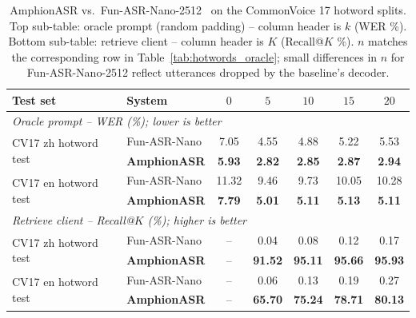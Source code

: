 \begin{table}[t]
  \caption{AmphionASR vs.\ Fun-ASR-Nano-2512~\cite{funasrnano} on
    the CommonVoice 17 hotword splits. Top sub-table: oracle prompt
    (random padding) -- column header is $k$ (WER \%). Bottom
    sub-table: retrieve client -- column header is $K$
    (Recall@$K$ \%). $n$ matches the corresponding row in
    Table~\ref{tab:hotwords_oracle}; small differences in $n$ for
    Fun-ASR-Nano-2512 reflect utterances dropped by the baseline's
    decoder.}
  \label{tab:hotwords_baseline}
  \centering
  \small
  \setlength{\tabcolsep}{4pt}
  \begin{tabular}{llccccc}
    \toprule
    Test set & System & $0$ & $5$ & $10$ & $15$ & $20$ \\
    \midrule
    \multicolumn{7}{l}{\emph{Oracle prompt -- WER (\%); lower is better}} \\
    \midrule
    \multirow{2}{*}{CV17 zh hotword test}
       & Fun-ASR-Nano        & 7.05          & 4.55          & 4.88          & 5.22          & 5.53 \\
       & \textbf{AmphionASR} & \textbf{5.93} & \textbf{2.82} & \textbf{2.85} & \textbf{2.87} & \textbf{2.94} \\
    \cmidrule(lr){2-7}
    \multirow{2}{*}{CV17 en hotword test}
       & Fun-ASR-Nano        & 11.32         & 9.46          & 9.73          & 10.05         & 10.28 \\
       & \textbf{AmphionASR} & \textbf{7.79} & \textbf{5.01} & \textbf{5.11} & \textbf{5.13} & \textbf{5.11} \\
    \midrule
    \multicolumn{7}{l}{\emph{Retrieve client -- Recall@$K$ (\%); higher is better}} \\
    \midrule
    \multirow{2}{*}{CV17 zh hotword test}
       & Fun-ASR-Nano        & -- & 0.04           & 0.08           & 0.12           & 0.17 \\
       & \textbf{AmphionASR} & -- & \textbf{91.52} & \textbf{95.11} & \textbf{95.66} & \textbf{95.93} \\
    \cmidrule(lr){2-7}
    \multirow{2}{*}{CV17 en hotword test}
       & Fun-ASR-Nano        & -- & 0.06           & 0.13           & 0.19           & 0.27 \\
       & \textbf{AmphionASR} & -- & \textbf{65.70} & \textbf{75.24} & \textbf{78.71} & \textbf{80.13} \\
    \bottomrule
  \end{tabular}
\end{table}

